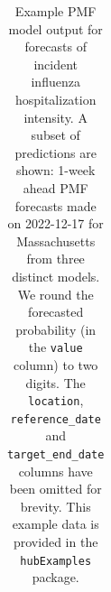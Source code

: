 \documentclass[
  letterpaper,
  DIV=11,
  numbers=noendperiod]{scrartcl}
\begin{document}
\begin{longtable}[]{@{}
  >{\raggedright\arraybackslash}p{}
  >{\raggedright\arraybackslash}p{}
  >{\raggedleft\arraybackslash}p{}
  >{\raggedright\arraybackslash}p{}
  >{\raggedright\arraybackslash}p{}
  >{\raggedleft\arraybackslash}p{}@{}}

\caption{\label{tbl-example-forecasts-pmf}Example PMF model output for
forecasts of incident influenza hospitalization intensity. A subset of
predictions are shown: 1-week ahead PMF forecasts made on 2022-12-17 for
Massachusetts from three distinct models. We round the forecasted
probability (in the \texttt{value} column) to two digits. The
\texttt{location}, \texttt{reference\_date} and
\texttt{target\_end\_date} columns have been omitted for brevity. This
example data is provided in the \texttt{hubExamples} package.}

\tabularnewline


\end{longtable}
\end{document}
